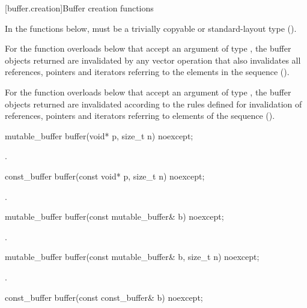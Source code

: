 [buffer.creation]{Buffer creation functions}

\pnum
In the functions below,  must be a trivially copyable or standard-layout type ().

\pnum
For the function overloads below that accept an argument of type , the buffer objects returned are invalidated by any vector operation that also invalidates all references, pointers and iterators referring to the elements in the sequence ().

\pnum
For the function overloads below that accept an argument of type , the buffer objects returned are invalidated according to the rules defined for invalidation of references, pointers and iterators referring to elements of the sequence ().

%
\begin{itemdecl}
mutable_buffer buffer(void* p, size_t n) noexcept;
\end{itemdecl}

\begin{itemdescr}
\pnum
\returns {}.
\end{itemdescr}

\begin{itemdecl}
const_buffer buffer(const void* p, size_t n) noexcept;
\end{itemdecl}

\begin{itemdescr}
\pnum
\returns {}.
\end{itemdescr}

\begin{itemdecl}
mutable_buffer buffer(const mutable_buffer& b) noexcept;
\end{itemdecl}

\begin{itemdescr}
\pnum
\returns {}.
\end{itemdescr}

\begin{itemdecl}
mutable_buffer buffer(const mutable_buffer& b, size_t n) noexcept;
\end{itemdecl}

\begin{itemdescr}
\pnum
\returns {}.
\end{itemdescr}

\begin{itemdecl}
const_buffer buffer(const const_buffer& b) noexcept;
\end{itemdecl}


